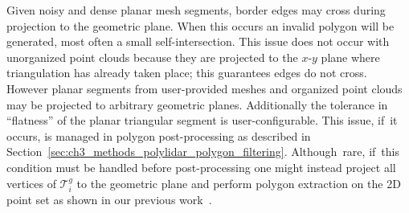 Given noisy and dense planar mesh segments, border edges may cross during projection to the geometric plane.  When this occurs an invalid polygon will be generated, most often a small self-intersection. This issue does not occur with unorganized point clouds because they are projected to the $x$-$y$ plane where triangulation has already taken place; this guarantees edges do not cross. However planar segments from user-provided meshes and organized point clouds may be projected to arbitrary geometric planes. Additionally the tolerance in ``flatness'' of the planar triangular segment is user-configurable.  This issue, if~it occurs, is managed in polygon post-processing as described in Section~\ref{sec:ch3_methods_polylidar_polygon_filtering}. Although~rare, if~this condition must be handled before post-processing one might instead project all vertices of $\mathcal{T}^{g}_i$ to the geometric plane and perform polygon extraction on the 2D point set as shown in our previous work~\cite{castagno_polylidar_2020}.
\vspace{-6pt}
